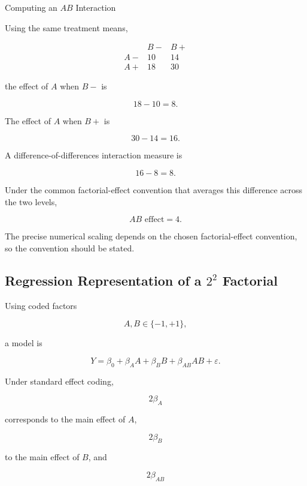 \begin{workedexamplebox}{Computing an \(AB\) Interaction}

Using the same treatment means,

\[
\begin{array}{c|cc}
&
B-
&
B+
\\
\hline
A-
&
10
&
14
\\
A+
&
18
&
30
\end{array}
\]

the effect of \(A\) when \(B-\) is

\[
18-10=8.
\]

The effect of \(A\) when \(B+\) is

\[
30-14=16.
\]

A difference-of-differences interaction measure is

\[
16-8=8.
\]

Under the common factorial-effect convention that averages this
difference across the two levels,

\begin{answerbox}
\[
\boxed{
AB\text{ effect}=4.
}
\]
\end{answerbox}

The precise numerical scaling depends on the chosen factorial-effect
convention, so the convention should be stated.

\end{workedexamplebox}

\subsection{Regression Representation of a \(2^2\) Factorial}
\label{subsec:regression-2x2-factorial}

Using coded factors

\[
A,B\in\{-1,+1\},
\]

a model is

\[
\boxed{
Y
=
\beta_0
+
\beta_AA
+
\beta_BB
+
\beta_{AB}AB
+
\varepsilon.
}
\]

Under standard effect coding,

\[
2\beta_A
\]

corresponds to the main effect of \(A\),

\[
2\beta_B
\]

to the main effect of \(B\), and

\[
2\beta_{AB}
\]

